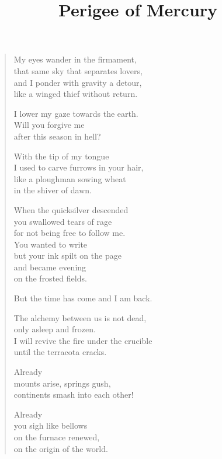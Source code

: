 \documentclass[twocolumn,12pt]{article}
\title{Perigee of Mercury}
\author{}
\date{}
\begin{document}
\maketitle

\thispagestyle{empty}



\bigskip

\begin{verse}%
  My eyes wander in the firmament, \\
  that same sky that separates lovers, \\
  and I ponder with gravity a detour, \\
  like a winged thief without return.

  I lower my gaze towards the earth. \\
  Will you forgive me \\
  after this season in hell?

  With the tip of my tongue \\
  I used to carve furrows in your hair, \\
  like a ploughman sowing wheat \\
  in the shiver of dawn.

  When the quicksilver descended \\
  you swallowed tears of rage \\
  for not being free to follow me. \\
  You wanted to write \\
  but your ink spilt on the page \\
  and became evening \\
  on the frosted fields.

  But the time has come and I am back.

  The alchemy between us is not dead, \\
  only asleep and frozen. \\
  I will revive the fire under the crucible \\
  until the terracota cracks.

  \newpage

  Already \\
  mounts arise, springs gush, \\
  continents smash into each other!

  Already \\
  you sigh like bellows \\
  on the furnace renewed, \\
  on the origin of the world.


\end{verse}
\end{document}
